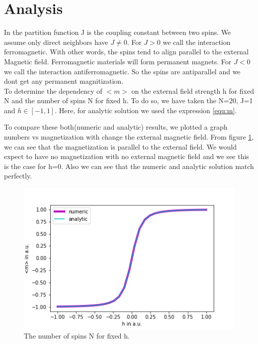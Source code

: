 \documentclass[11pt, a4paper, DIV=12]{scrartcl}
\begin{document}
\section{Analysis}
In the partition function J is the coupling constant between two spins. We assume only direct neighbors have $J\neq 0$. For $J>0$ we call the interaction ferromagnetic. With other words, the spins tend to align parallel to the external Magnetic field. Ferromagnetic materials will form permanent magnets. For $J<0$ we call the interaction antiferromagnetic. So the spins are antiparallel and we dont get any permanent magnitization.\\

To determine the dependency of $ <m> $ on the external field strength h for fixed N and the number of spins N for fixed h. To do so, we have taken the N=20, J=1 and $h \in [-1, 1]$. Here, for analytic solution we used the expression \ref{equ:m}.

To compare these both(numeric and analytic) results, we plotted a graph numbers vs magnetization with change the external magnetic field. From figure \ref{fig:Nconst}, we can see that the magnetization is parallel to the external field. We would expect to have no magnetization with no external magnetic field and we see this is the case for h=0. Also we can see that the numeric and analytic solution match perfectly.
\begin{figure}[H]
	\centering
	\includegraphics[width=0.8\linewidth]{Nconst.png}
	\caption{The number of spins N for fixed h.}
	\label{fig:Nconst}
\end{figure}
\end{document}
